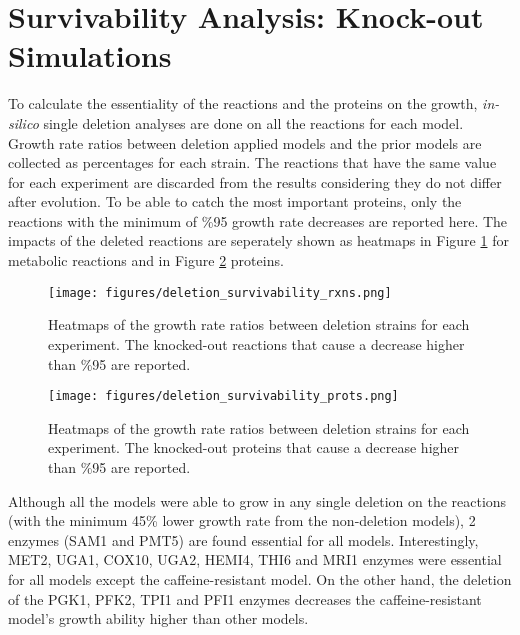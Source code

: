 \section{Survivability Analysis: Knock-out Simulations}
To calculate the essentiality of the reactions and the proteins on the growth, \emph{in-silico} single deletion analyses are done on all the reactions for each model. Growth rate ratios between deletion applied models and the prior models are collected as percentages for each strain. The reactions that have the same value for each experiment are discarded from the results considering they do not differ after evolution. To be able to catch the most important proteins, only the reactions with the minimum of \%95 growth rate decreases are reported here. The impacts of the deleted reactions are seperately shown as heatmaps in Figure \ref{fig:deletion_survivability_rxns} for metabolic reactions and in Figure \ref{fig:deletion_survivability_prots} proteins.

\begin{figure}[H]
  \begin{center}
  \texttt{[image: figures/deletion\_survivability\_rxns.png]}
  \caption[Heatmaps of the growth rate ratios between deletion strains for each experiment. The knocked-out reactions that cause a decrease higher than \%95 are reported.]{Heatmaps of the growth rate ratios between deletion strains for each experiment. The knocked-out reactions that cause a decrease higher than \%95 are reported.}
  \label{fig:deletion_survivability_rxns}
  \end{center}
\end{figure}

\begin{figure}[H]
  \begin{center}
  \texttt{[image: figures/deletion\_survivability\_prots.png]}
  \caption[Heatmaps of the growth rate ratios between deletion strains for each experiment. The knocked-out proteins that cause a decrease higher than \%95 are reported.]{Heatmaps of the growth rate ratios between deletion strains for each experiment. The knocked-out proteins that cause a decrease higher than \%95 are reported.}
  \label{fig:deletion_survivability_prots}
  \end{center}
\end{figure}

Although all the models were able to grow in any single deletion on the reactions (with the minimum 45\% lower growth rate from the non-deletion models), 2 enzymes (SAM1 and PMT5) are found essential for all models. Interestingly, MET2, UGA1, COX10, UGA2, HEMI4, THI6 and MRI1 enzymes were essential for all models except the caffeine-resistant model. On the other hand, the deletion of the PGK1, PFK2, TPI1 and PFI1 enzymes decreases the caffeine-resistant model's growth ability higher than other models.

